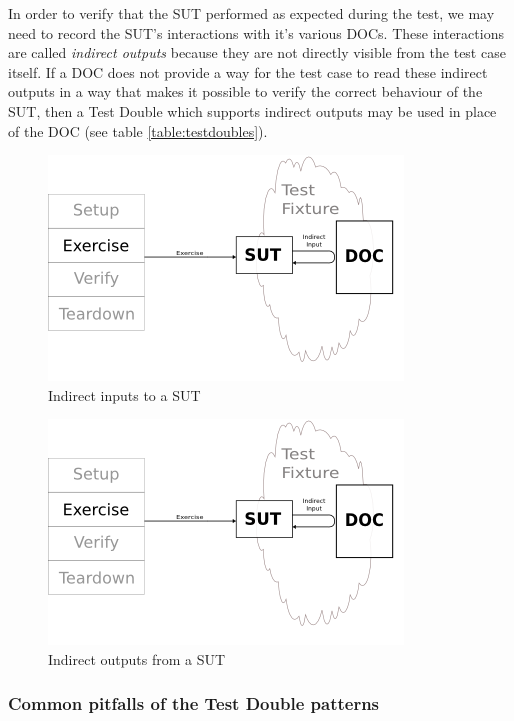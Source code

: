 In order to verify that the SUT performed as expected during the test,
we may need to record the SUT's interactions with it's various
DOCs. These interactions are called \textit{indirect outputs} because
they are not directly visible from the test case itself. If a DOC does
not provide a way for the test case to read these indirect outputs in
a way that makes it possible to verify the correct behaviour of the
SUT, then a Test Double which supports indirect outputs may be used in
place of the DOC (see table \ref{table:testdoubles}).

\begin{figure}
  \centering
  \includegraphics[scale=1.0]{img/indirect_inputs.png}
  \caption[Indirect Inputs]{Indirect inputs to a SUT\footnotemark}
  \label{fig:indirect_inputs}
\end{figure}

\begin{figure}
  \centering
  \includegraphics[scale=1.0]{img/indirect_inputs.png}
  \caption[Indirect Outputs]{Indirect outputs from a SUT\footnotemark}
  \label{fig:indirect_outputs}
\end{figure}

\subsubsection{Common pitfalls of the Test Double patterns}

